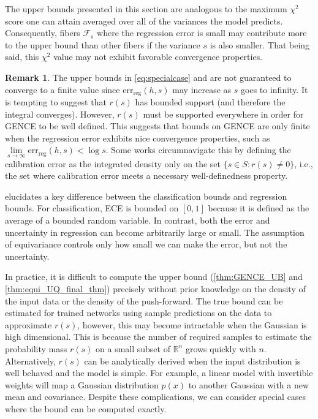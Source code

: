 \documentclass[10pt]{article} %
\theoremstyle{definition}
\newtheorem{rmk}{Remark}
\begin{document}
The upper bounds presented in this section are analogous to the maximum $\chi^2$ score one can attain averaged over all of the variances the model predicts. Consequently, fibers $\mathcal{F}_s$ where the regression error is small may contribute more to the upper bound than other fibers if the variance $s$ is also smaller. That being said, this $\chi^2$ value may not exhibit favorable convergence properties.

\begin{rmk} \label{rmk:converge}
The upper bounds in \cref{eq:specialcase} and  are not guaranteed to converge to a finite value since $\text{err}_{\text{reg}}(h,s)$ may increase as $s$ goes to infinity. It is tempting to suggest that $r(s)$ has bounded support (and therefore the integral converges). However, $r(s)$ must be supported everywhere in order for GENCE to be well defined. This suggests that bounds on GENCE are only finite when the regression error exhibits nice convergence properties, such as $\underset{s \to \infty}{\lim}\text{err}_{\text{reg}}(h,s) < \log s$. Some works \citep[e.g.,][]{vaicenavicius2019evaluating} circumnavigate this by defining the calibration error as the integrated density only on the set $\{s \in S \colon r(s) \neq 0\}$, i.e., the set where calibration error meets a necessary well-definedness property. 
\end{rmk}

 elucidates a key difference between the classification bounds and regression bounds. For classification, ECE is bounded on $[0,1]$ because it is defined as the average of a bounded random variable. In contrast, both the error and uncertainty in regression can become arbitrarily large or small. The assumption of equivariance controls only how small we can make the error, but not the uncertainty.

In practice, it is difficult to compute the upper bound (\cref{thm:GENCE_UB} and \cref{thm:equi_UQ_final_thm}) precisely without prior knowledge on the density of the input data or the density of the push-forward. The true bound can be estimated for trained networks using sample predictions on the data to approximate $r(s)$, however, this may become intractable when the Gaussian is high dimensional. This is because the number of required samples to estimate the probability mass $r(s)$ on a small subset of $\mathbb{R}^n$ grows quickly with $n$. Alternatively, $r(s)$ can be analytically derived when the input distribution is well behaved and the model is simple. For example, a linear model with invertible weights will map a Gaussian distribution $p(x)$ to another Gaussian with a new mean and covariance. Despite these complications, we can consider special cases where the bound can be computed exactly.  
\end{document}
